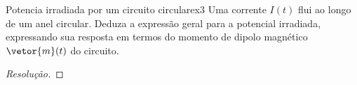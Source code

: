 \begin{exercício}{Potencia irradiada por um circuito circular}{ex3}
    Uma corrente \(I(t)\) flui ao longo de um anel circular. Deduza a expressão geral para a potencial irradiada, expressando sua resposta em termos do momento de dipolo magnético \(\vetor{m}(t)\) do circuito.
\end{exercício}
\begin{proof}[Resolução]
    
\end{proof}
